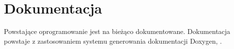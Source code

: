 \section{Dokumentacja}
Powstające oprogramowanie jest na bieżąco dokumentowane. Dokumentacja powstaje z zastosowaniem systemu generowania dokumentacji \textsf{Doxygen}, \cite{website:doxygen}.

